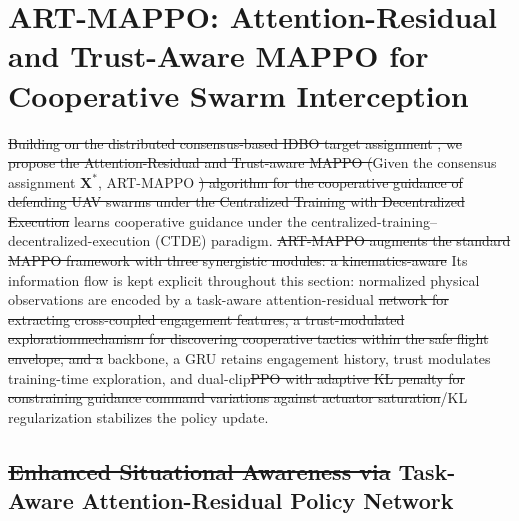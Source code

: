 \documentclass[lettersize,journal]{IEEEtran}
\providecommand{\DIFadd}[1]{{\protect\color{blue}#1}} %
\providecommand{\DIFdel}[1]{{\protect\color{red}\sout{#1}}}                      %
\providecommand{\DIFaddbegin}{} %
\providecommand{\DIFaddend}{} %
\providecommand{\DIFdelbegin}{} %
\providecommand{\DIFdelend}{} %
\newcommand{\DIFscaledelfig}{0.5}
\newlength{\DIFdelgraphicswidth} %
\newlength{\DIFdelgraphicsheight} %
\newcommand{\DIFaddincludegraphics}[2][]{{\color{blue}\fbox{\DIFOincludegraphics[#1]{#2}}}} %
\newcommand{\DIFdelincludegraphics}[2][]{%
\sbox{\DIFdelgraphicsbox}{\DIFOincludegraphics[#1]{#2}}%
\settoboxwidth{\DIFdelgraphicswidth}{\DIFdelgraphicsbox} %
\settoboxtotalheight{\DIFdelgraphicsheight}{\DIFdelgraphicsbox} %
\scalebox{\DIFscaledelfig}{%
\parbox[b]{\DIFdelgraphicswidth}{\usebox{\DIFdelgraphicsbox}\\[-\baselineskip] \rule{\DIFdelgraphicswidth}{0em}}\llap{\resizebox{\DIFdelgraphicswidth}{\DIFdelgraphicsheight}{%
\setlength{\unitlength}{\DIFdelgraphicswidth}%
\begin{picture}(1,1)%
\thicklines\linethickness{2pt} %
{\color[rgb]{1,0,0}\put(0,0){\framebox(1,1){}}}%
{\color[rgb]{1,0,0}\put(0,0){\line( 1,1){1}}}%
{\color[rgb]{1,0,0}\put(0,1){\line(1,-1){1}}}%
\end{picture}%
}\hspace*{3pt}}} %
} %
\DeclareRobustCommand{\DIFaddbegin}{\DIFOaddbegin \let\includegraphics\DIFaddincludegraphics} %
\DeclareRobustCommand{\DIFaddend}{\DIFOaddend \let\includegraphics\DIFOincludegraphics} %
\DeclareRobustCommand{\DIFdelbegin}{\DIFOdelbegin \let\includegraphics\DIFdelincludegraphics} %
\DeclareRobustCommand{\DIFdelend}{\DIFOaddend \let\includegraphics\DIFOincludegraphics} %
\begin{document}
\section{ART-MAPPO: Attention-Residual and Trust-Aware MAPPO for Cooperative Swarm Interception}
\label{sec:cooperative_algorithm}

\DIFdelbegin \DIFdel{Building on the distributed consensus-based IDBO target assignment , we propose the Attention-Residual and Trust-aware MAPPO (}\DIFdelend \DIFaddbegin \DIFadd{Given the consensus assignment $\mathbf X^{*}$, }\DIFaddend ART-MAPPO \DIFdelbegin \DIFdel{) algorithm for the cooperative guidance of defending UAV swarms under
the Centralized Training with Decentralized Execution }\DIFdelend \DIFaddbegin \DIFadd{learns cooperative guidance under
the centralized-training--decentralized-execution }\DIFaddend (CTDE) paradigm. \DIFdelbegin \DIFdel{ART-MAPPO augments the standard MAPPO framework with three synergistic modules: a kinematics-aware }\DIFdelend \DIFaddbegin \DIFadd{Its information flow is
kept explicit throughout this section: normalized physical observations are encoded by a
task-aware }\DIFaddend attention-residual \DIFdelbegin \DIFdel{network for extracting cross-coupled engagement features, a trust-modulated explorationmechanism for discovering cooperative tactics within the safe flight envelope, and a }\DIFdelend \DIFaddbegin \DIFadd{backbone, a GRU retains engagement history, trust modulates
training-time exploration, and }\DIFaddend dual-clip\DIFdelbegin \DIFdel{PPO with adaptive KL penalty for constraining guidance command variations against actuator saturation}\DIFdelend \DIFaddbegin \DIFadd{/KL regularization stabilizes the policy update}\DIFaddend .

\subsection{\DIFdelbegin \DIFdel{Enhanced Situational Awareness via }\DIFdelend \DIFaddbegin \DIFadd{Task-Aware }\DIFaddend Attention-Residual \DIFaddbegin \DIFadd{Policy }\DIFaddend Network}
\label{subsec:attention_residual}
\end{document}

